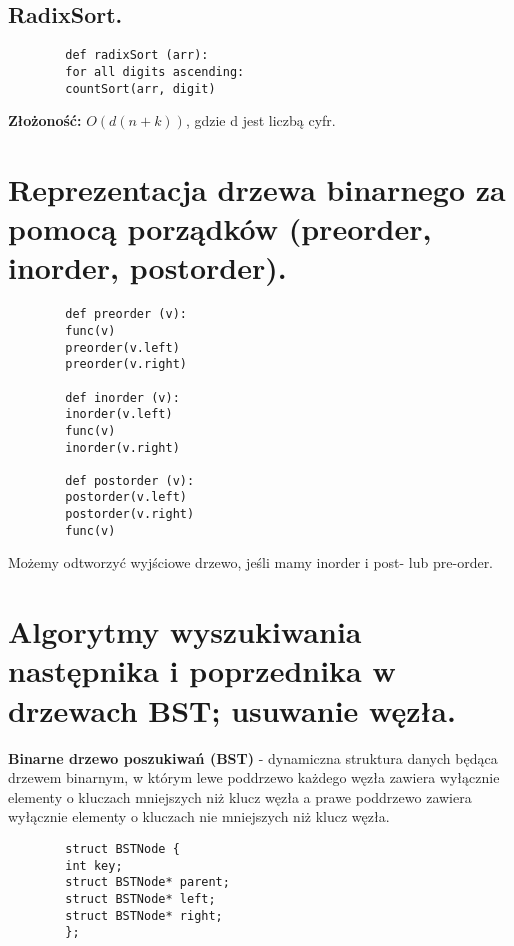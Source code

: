 \documentclass[main.tex]{subfiles}
\begin{document}
    \subsection{RadixSort.}
    \begin{verbatim}
        def radixSort (arr):
        for all digits ascending:
        countSort(arr, digit)
    \end{verbatim}
    \textbf{Złożoność:} $O(d(n+k))$, gdzie d jest liczbą cyfr.

    \newpage

    \section{Reprezentacja drzewa binarnego za pomocą porządków (preorder, inorder, postorder).}


    \begin{verbatim}
        def preorder (v):
        func(v)
        preorder(v.left)
        preorder(v.right)

        def inorder (v):
        inorder(v.left)
        func(v)
        inorder(v.right)

        def postorder (v):
        postorder(v.left)
        postorder(v.right)
        func(v)
    \end{verbatim}

    Możemy odtworzyć wyjściowe drzewo, jeśli mamy inorder i post- lub pre-order.

    \newpage

    \section{Algorytmy wyszukiwania następnika i poprzednika w drzewach BST; usuwanie węzła.}

    \begin{definition}
        \textbf{Binarne drzewo poszukiwań (BST)} - dynamiczna struktura danych będąca drzewem binarnym, w którym lewe
        poddrzewo każdego węzła zawiera wyłącznie elementy o kluczach mniejszych niż klucz węzła a prawe poddrzewo
        zawiera wyłącznie elementy o kluczach nie mniejszych niż klucz węzła.
    \end{definition}

    \begin{verbatim}
        struct BSTNode {
        int key;
        struct BSTNode* parent;
        struct BSTNode* left;
        struct BSTNode* right;
        };
    \end{verbatim}
\end{document}
